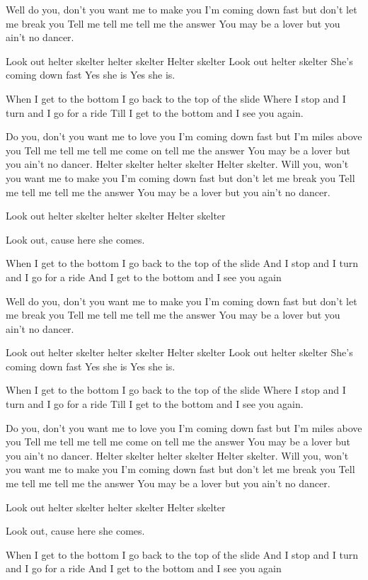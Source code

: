 \documentclass[vruler,JCS]{COB}
\begin{document}
Well do you, don't you want me to make you
I'm coming down fast but don't let me break you
Tell me tell me tell me the answer
You may be a lover but you ain't no dancer.

Look out helter skelter helter skelter
Helter skelter
Look out helter skelter
She's coming down fast 
Yes she is 
Yes she is.

When I get to the bottom I go back to the top of the slide
Where I stop and I turn and I go for a ride
Till I get to the bottom and I see you again.

Do you, don't you want me to love you
I'm coming down fast but I’m miles above you
Tell me tell me tell me come on tell me the answer
You may be a lover but you ain't no dancer.
Helter skelter helter skelter
Helter skelter.
Will you, won't you want me to make you
I'm coming down fast but don't let me break you
Tell me tell me tell me the answer
You may be a lover but you ain't no dancer.

Look out helter skelter helter skelter
Helter skelter 

Look out, cause here she comes.

When I get to the bottom I go back to the top of the slide
And I stop and I turn and I go for a ride
And I get to the bottom and I see you again

Well do you, don't you want me to make you
I'm coming down fast but don't let me break you
Tell me tell me tell me the answer
You may be a lover but you ain't no dancer.

Look out helter skelter helter skelter
Helter skelter
Look out helter skelter
She's coming down fast 
Yes she is 
Yes she is.

When I get to the bottom I go back to the top of the slide
Where I stop and I turn and I go for a ride
Till I get to the bottom and I see you again.

Do you, don't you want me to love you
I'm coming down fast but I’m miles above you
Tell me tell me tell me come on tell me the answer
You may be a lover but you ain't no dancer.
Helter skelter helter skelter
Helter skelter.
Will you, won't you want me to make you
I'm coming down fast but don't let me break you
Tell me tell me tell me the answer
You may be a lover but you ain't no dancer.

Look out helter skelter helter skelter
Helter skelter 

Look out, cause here she comes.

When I get to the bottom I go back to the top of the slide
And I stop and I turn and I go for a ride
And I get to the bottom and I see you again
\end{document}
